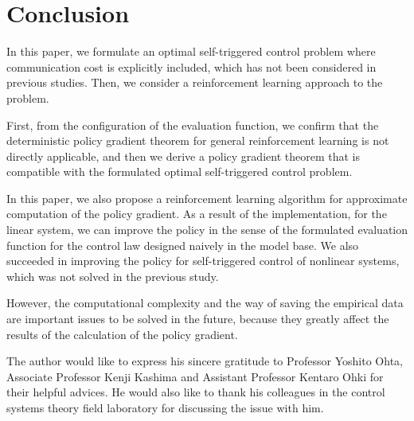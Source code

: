 \documentclass[english, dvipdfmx]{ampmt}             %
\begin{document}
\section{Conclusion}
In this paper, we formulate an optimal self-triggered control problem where communication cost is explicitly included, which has not been considered in previous studies. Then, we consider a reinforcement learning approach to the problem.  \par
First, from the configuration of the evaluation function, we confirm that the deterministic policy gradient theorem for general reinforcement learning is not directly applicable, and then we derive a policy gradient theorem that is compatible with the formulated optimal self-triggered control problem. \par
In this paper, we also propose a reinforcement learning algorithm for approximate computation of the policy gradient. As a result of the implementation, for the linear system, we can improve the policy in the sense of the formulated evaluation function for the control law designed naively in the model base. We also succeeded in improving the policy for self-triggered control of nonlinear systems, which was not solved in the previous study. \par
However, the computational complexity and the way of saving the empirical data are important issues to be solved in the future, because they greatly affect the results of the calculation of the policy gradient.

\acknowledgment
The author would like to express his sincere gratitude to Professor
Yoshito Ohta, Associate Professor Kenji Kashima and Assistant Professor Kentaro Ohki for their helpful advices. He would also like to thank his colleagues in the control systems theory field laboratory for discussing the issue with him.
\end{document}
